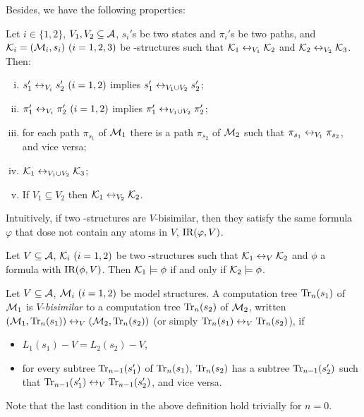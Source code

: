 \documentclass[letterpaper]{article} %
\begin{document}
Besides, we have the following properties:
\begin{proposition}\label{div}
Let $i\in \{1,2\}$, $V_1,V_2\subseteq\cal A$, $s_i'$s be two states and
  $\pi_i'$s be two paths,
and ${\cal K}_i=({\cal M}_i,s_i)~(i=1,2,3)$ be \MPK-structures
 such that
${\cal K}_1\leftrightarrow_{V_1}{\cal K}_2$ and ${\cal K}_2\leftrightarrow_{V_2}{\cal K}_3$.
 Then:
 \begin{enumerate}[(i)]
   \item $s_1'\leftrightarrow_{V_i}s_2'~(i=1,2)$ implies $s_1'\leftrightarrow_{V_1\cup V_2}s_2'$;
   \item $\pi_1'\leftrightarrow_{V_i}\pi_2'~(i=1,2)$ implies $\pi_1'\leftrightarrow_{V_1\cup V_2}\pi_2'$;
   \item for each path $\pi_{s_1}$ of ${\cal M}_1$ there is a path $\pi_{s_2}$  of ${\cal M}_2$ such that $\pi_{s_1} \leftrightarrow_{V_1} \pi_{s_2}$, and vice versa;
   \item ${\cal K}_1\leftrightarrow_{V_1\cup V_2}{\cal K}_3$;
   \item If $V_1 \subseteq V_2$ then ${\cal K}_1 \leftrightarrow_{V_2} {\cal K}_2$.
 \end{enumerate}
\end{proposition}








Intuitively, if two \MPK-structures are $V$-bisimilar, then they satisfy the same formula $\varphi$ that dose not contain any atoms in $V$, \ie $\textrm{IR}(\varphi, V)$.
\begin{theorem}\label{thm:V-bisimulation:EQ}
  Let $V\subseteq\cal A$, ${\cal K}_i~(i=1,2)$ be two \MPK-structures such that
  ${\cal K}_1\leftrightarrow_V{\cal K}_2$ and $\phi$ a formula with $\textrm{IR}(\phi,V)$. Then
  ${\cal K}_1\models\phi$ if and only if ${\cal K}_2\models\phi$.
\end{theorem}


Let $V\subseteq\cal A$, ${\cal M}_i~(i=1,2)$ be  model structures.
A computation tree $\textrm{Tr}_n(s_1)$ of ${\cal M}_1$ is $V$-{\em bisimilar}
to a computation tree $\textrm{Tr}_n(s_2)$ of ${\cal M}_2$, written
$({\cal M}_1,\textrm{Tr}_n(s_1))\leftrightarrow_V({\cal M}_2,\textrm{Tr}_n(s_2))$ (or simply
$\textrm{Tr}_n(s_1)\leftrightarrow_V\textrm{Tr}_n(s_2)$), if %
\begin{itemize}
  \item $L_1(s_1)- V=L_2(s_2)- V$,
  \item for every subtree $\textrm{Tr}_{n-1}(s_1')$ of $\textrm{Tr}_n(s_1)$,
  $\textrm{Tr}_n(s_2)$ has a subtree $\textrm{Tr}_{n-1}(s_2')$ such that
  $\textrm{Tr}_{n-1}(s_1')\leftrightarrow_V\textrm{Tr}_{n-1}(s_2')$, and vice versa.
\end{itemize}
Note that the last condition in the above definition
hold trivially for $n=0$.
\end{document}
